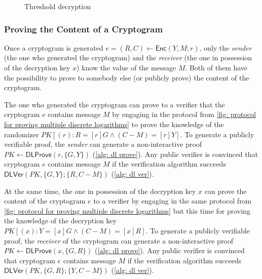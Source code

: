 \begin{figure}[ht]
    \caption{Threshold decryption}
    \label{fig: threshold decryption}
\end{figure}


\subsubsection{Proving the Content of a Cryptogram} \label{app: proving the content of a cryptogram}
Once a cryptogram is generated $e = (R, C) \gets \mathsf{Enc} (Y, M; r)$, only the \textit{sender} (the one who generated the cryptogram) and the \textit{receiver} (the one in possession of the decryption key $x$) know the value of the message $M$. Both of them have the possibility to prove to somebody else (or publicly prove) the content of the cryptogram.

The one who generated the cryptogram can prove to a verifier that the cryptogram $e$ contains message $M$ by engaging in the protocol from \cref{fig: protocol for proving multiple discrete logarithms} to prove the knowledge of the randomizer $PK[(r): R = [r]G \wedge (C - M) = [r]Y]$. To generate a publicly verifiable proof, the \textit{sender} can generate a non-interactive proof $PK \gets \mathsf{DLProve} (r, \{ G, Y \})$ (\cref{alg: dl prove}). Any public verifier is convinced that cryptogram $e$ contains message $M$ if the verification algorithm succeeds $\mathsf{DLVer} (PK, \{ G, Y \}; \{ R, C - M \})$ (\cref{alg: dl ver}).

At the same time, the one in possession of the decryption key $x$ can prove the content of the cryptogram $e$ to a verifier by engaging in the same protocol from \cref{fig: protocol for proving multiple discrete logarithms} but this time for proving the knowledge of the decryption key $PK[(x): Y = [x]G \wedge (C - M) = [x]R]$. To generate a publicly verifiable proof, the \textit{receiver} of the cryptogram can generate a non-interactive proof $PK \gets \mathsf{DLProve} (x, \{ G, R \})$ (\cref{alg: dl prove}). Any public verifier is convinced that cryptogram $e$ contains message $M$ if the verification algorithm succeeds $\mathsf{DLVer} (PK, \{ G, R \}; \{ Y, C - M \})$ (\cref{alg: dl ver}).


